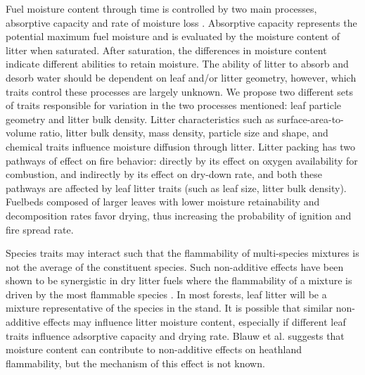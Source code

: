 \documentclass[fire,article,submit,moreauthors,pdftex]{Definitions/mdpi}
\begin{document}
Fuel moisture content through time is controlled by two main processes, absorptive capacity and rate of moisture loss \citep{Kreye-2013}. Absorptive capacity represents the potential maximum fuel moisture and is evaluated by the moisture content of litter when saturated. After saturation, the differences in moisture content indicate different abilities to retain moisture. The ability of litter to absorb and desorb water should be dependent on leaf and/or litter geometry, however, which traits control these processes are largely unknown. We propose two different sets of traits responsible for variation in the two processes mentioned: leaf particle geometry and litter bulk density. Litter characteristics such as surface-area-to-volume ratio, litter bulk density, mass density, particle size and shape, and chemical traits influence moisture diffusion through litter. Litter packing has two pathways of effect on fire behavior: directly by its effect on oxygen availability for combustion, and indirectly by its effect on dry-down rate, and both these pathways are affected by leaf litter traits (such as leaf size, litter bulk density). Fuelbeds composed of larger leaves with lower moisture retainability and decomposition rates favor drying, thus increasing the probability of ignition and fire spread rate.

Species traits may interact such that the flammability of multi-species mixtures is not the average of the constituent species.  Such non-additive effects have been shown to be synergistic in dry litter fuels where the flammability of a mixture is driven by the most flammable species  \cite{VanAltena+Logtestjin+etal-2012, Magalhaes+Schwilk-2012}. In most forests, leaf litter will be a mixture representative of the species in the stand. It is possible that similar non-additive effects may influence litter moisture content, especially if different leaf traits influence adsorptive capacity and drying rate. Blauw et al.\cite{Blauw+Wensink+etal-2015} suggests that moisture content can contribute to non-additive effects on heathland flammability, but the mechanism of this effect is not known.

\end{document}
